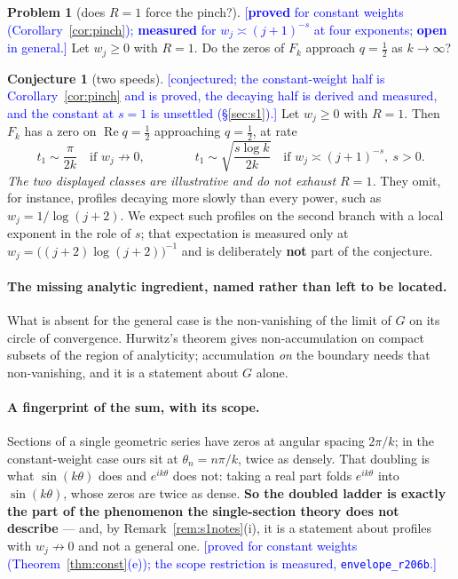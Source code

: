 \documentclass[11pt,a4paper]{article}
\theoremstyle{plain}
\theoremstyle{definition}
\newtheorem{problem}[theorem]{Problem}
\newtheorem{conjecture}[theorem]{Conjecture}
\theoremstyle{remark}
\newcommand{\STATUS}[1]{\textcolor{blue}{\textsf{[#1]}}}
\begin{document}
\begin{problem}[does $R=1$ force the pinch?]\label{prob:general}
\STATUS{\textbf{proved} for constant weights (Corollary~\ref{cor:pinch});
\textbf{measured} for $w_j\asymp(j+1)^{-s}$ at four exponents; \textbf{open} in general.}
Let $w_j\ge0$ with $R=1$. Do the zeros of $F_k$ approach $q=\tfrac12$ as $k\to\infty$?
\end{problem}

\begin{conjecture}[two speeds]\label{conj:line}
\STATUS{conjectured; the constant-weight half is Corollary~\ref{cor:pinch} and is
proved, the decaying half is derived and measured, and the constant at $s=1$ is
unsettled (\S\ref{sec:s1}).}
Let $w_j\ge0$ with $R=1$. Then $F_k$ has a zero on $\operatorname{Re}q=\tfrac12$
approaching $q=\tfrac12$, at rate
\[
  t_1\sim\frac{\pi}{2k}\quad\text{if }w_j\not\to0,
  \qquad\qquad
  t_1\sim\sqrt{\frac{s\log k}{2k}}\quad\text{if }w_j\asymp(j+1)^{-s},\ s>0 .
\]
\emph{The two displayed classes are illustrative and do not exhaust $R=1$.} They omit,
for instance, profiles decaying more slowly than every power, such as
$w_j=1/\log(j+2)$. We expect such profiles on the second branch with a local exponent in
the role of $s$; that expectation is measured only at
$w_j=\bigl((j+2)\log(j+2)\bigr)^{-1}$ and is deliberately \textbf{not} part of the
conjecture.
\end{conjecture}

\paragraph{The missing analytic ingredient, named rather than left to be located.}
What is absent for the general case is the non-vanishing of the limit of $G$ on its
circle of convergence. Hurwitz's theorem gives non-accumulation on compact subsets of
the region of analyticity; accumulation \emph{on} the boundary needs that non-vanishing,
and it is a statement about $G$ alone.

\paragraph{A fingerprint of the sum, with its scope.}
Sections of a single geometric series have zeros at angular spacing $2\pi/k$; in the
constant-weight case ours sit at $\theta_n=n\pi/k$, twice as densely. That doubling is
what $\sin(k\theta)$ does and $e^{ik\theta}$ does not: taking a real part folds
$e^{ik\theta}$ into $\sin(k\theta)$, whose zeros are twice as dense. \textbf{So the
doubled ladder is exactly the part of the phenomenon the single-section theory does not
describe} --- and, by Remark~\ref{rem:s1notes}(i), it is a statement about profiles with
$w_j\not\to0$ and not a general one.
\STATUS{proved for constant weights (Theorem~\ref{thm:const}(e)); the scope restriction
is measured, \texttt{envelope\_r206b}.}
\end{document}
